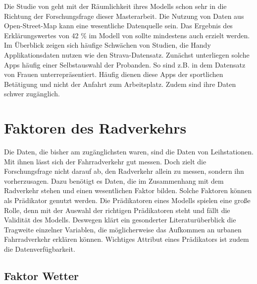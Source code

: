 \documentclass[a4paper,12pt]{thesis}
\begin{document}
Die Studie von \cite{Alattar2021} geht mit der Räumlichkeit ihres Modells schon sehr in die Richtung der Forschungsfrage dieser Masterarbeit. Die Nutzung von Daten aus Open-Street-Map kann eine wesentliche Datenquelle sein. Das Ergebnis des Erklärungswertes von 42 \% im Modell von \cite{Alattar2021} sollte mindestens auch erzielt werden.\\
Im Überblick zeigen sich häufige Schwächen von Studien, die Handy Applikationsdaten nutzen wie den Strava-Datensatz. Zunächst unterliegen solche Apps häufig einer Selbstauswahl der Probanden. So sind z.B. in dem Datensatz von \cite{Alattar2021} Frauen unterrepräsentiert. Häufig dienen diese Apps der sportlichen Betätigung und nicht der Anfahrt zum Arbeitsplatz. Zudem sind ihre Daten schwer zugänglich.


\section{Faktoren des Radverkehrs}

Die Daten, die bisher am zugänglichsten waren, sind die Daten von Leihstationen. Mit ihnen lässt sich der Fahrradverkehr gut messen. Doch zielt die Forschungsfrage nicht darauf ab, den Radverkehr allein zu messen, sondern ihn vorherzusagen. Dazu benötigt es Daten, die im Zusammenhang mit dem Radverkehr stehen und einen wesentlichen Faktor bilden. Solche Faktoren können als Prädikator genutzt werden. Die Prädikatoren eines Modells spielen eine große Rolle, denn mit der Auswahl der richtigen Prädikatoren steht und fällt die Validität des Modells. Deswegen klärt ein gesonderter Literaturüberblick die Tragweite einzelner Variablen, die möglicherweise das Aufkommen an urbanen Fahrradverkehr erklären können. Wichtiges Attribut eines Prädikators ist zudem die Datenverfügbarkeit. 

\subsection{Faktor Wetter}
\end{document}
